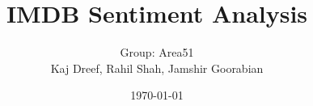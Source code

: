 \documentclass{IEEEtran}
\begin{document}
\title{IMDB Sentiment Analysis}
\author{Group: Area51\\Kaj Dreef, Rahil Shah, Jamshir Goorabian}
\date{\today}

\maketitle













\end{document}
